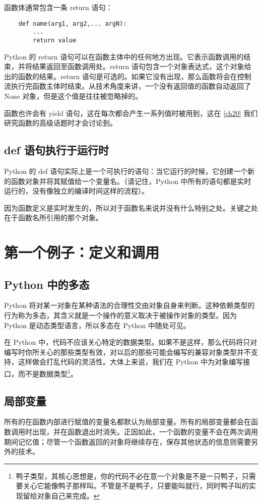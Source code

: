 函数体通常包含一条 return 语句：
\begin{verbatim}
    def name(arg1, arg2,... argN):
        ...
        return value
\end{verbatim}

Python 的 return 语句可以在函数主体中的任何地方出现。它表示函数调用的结束，并将结果返回至函数调用处。return 语句包含一个对象表达式，这个对象给出的函数的结果。return 语句是可选的。如果它没有出现，那么函数将会在控制流执行完函数主体时结束。从技术角度来讲，一个没有返回值的函数自动返回了 None 对象，但是这个值是往往被忽略掉的。

函数也许会有 yield 语句，这在每次都会产生一系列值时被用到，这在 \autoref{ch20} 我们研究函数的高级话题时才会讨论到。
\subsection{def 语句执行于运行时}
Python 的 def 语句实际上是一个可执行的语句：当它运行的时候，它创建一个新的函数对象并将其赋值给一个变量名。（请记住，Python 中所有的语句都是实时运行的，没有像独立的编译时间这样的流程）。

因为函数定义是实时发生的，所以对于函数名来说并没有什么特别之处。关键之处在于函数名所引用的那个对象。
\section{第一个例子：定义和调用}
\subsection{Python 中的多态}
Python 将对某一对象在某种语法的合理性交由对象自身来判断。这种依赖类型的行为称为多态，其含义就是一个操作的意义取决于被操作对象的类型。因为 Python 是动态类型语言，所以多态在 Python 中随处可见。

在 Python 中，代码不应该关心特定的数据类型。如果不是这样，那么代码将只对编写时你所关心的那些类型有效，对以后的那些可能会编写的兼容对象类型并不支持，这样做会打乱代码的灵活性。大体上来说，我们在 Python 中为对象编写接口，而不是数据类型\footnote{鸭子类型，其核心思想是，你的代码不必在意一个对象是不是一只鸭子，只需要关心它能像鸭子那样叫。不管是不是鸭子，只要能叫就行，同时鸭子叫的实现留给对象自己来完成。}。
\subsection{局部变量}
所有的在函数内部进行赋值的变量名都默认为局部变量。所有的局部变量都会在函数调用时出现，并在函数退出时消失。正因如此，一个函数的变量不会在两次调用期间记忆值；尽管一个函数返回的对象将继续存在，保存其他状态的信息则需要另外的技术。